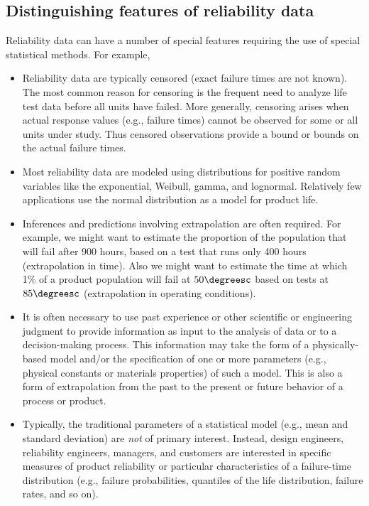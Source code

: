 \subsection{Distinguishing features of reliability data}

Reliability data can have a number of special features requiring
the use of special statistical methods. For example,

\begin{itemize} 
\item 
Reliability data are typically censored (exact failure times are not
known). The most common reason for censoring is the frequent need to
analyze life test data before all units have failed.  More
generally, censoring arises when actual response values (e.g.,
failure times) cannot be observed for some or all units under
study. Thus censored observations provide a bound or bounds on the
actual failure times.

\item 
Most reliability data are modeled using distributions for positive
random variables like the exponential, Weibull, gamma, and lognormal.
Relatively few applications use the normal distribution as a model for
product life.

\item 
Inferences and predictions involving extrapolation are often required.
For example, we might want to estimate the proportion of the
population that will fail after $900$ hours, based on a test that runs
only 400 hours (extrapolation in time). Also we might want to estimate
the time at which 1\% of a product population will fail at $50
\degreesc$ based on tests at $85 \degreesc$ (extrapolation in
operating conditions).

\item 
It is often necessary to use past experience or other scientific or
engineering judgment to provide information as input to the analysis
of data or to a decision-making process. This information may take the
form of a physically-based model and/or the specification of one or
more parameters (e.g., physical constants or materials properties) of
such a model.  This is also a form of extrapolation from the past to
the present or future behavior of a process or product.

\item 
Typically, the traditional parameters of a statistical model (e.g., mean and
standard deviation) are {\em not} of primary interest. Instead,
design engineers, reliability engineers, managers, and customers are
interested in specific measures of product reliability or particular
characteristics of a failure-time distribution (e.g., failure probabilities,
quantiles of the life distribution, failure rates, and so on).



\end{itemize}
